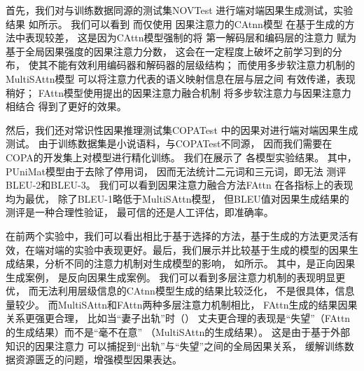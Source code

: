 
首先，我们对与训练数据同源的测试集NOVTest
进行端对端因果生成测试，实验结果
如所示。
我们可以看到
而仅使用
因果注意力的CAtnn模型
在基于生成的方法中表现较差，
这是因为CAttn模型强制的将
第一解码层和编码层的注意力
赋为基于全局因果强度的因果注意力分数，
这会在一定程度上破坏之前学习到的分布，
使其不能有效利用编码器和解码器的层级结构；
而使用多步软注意力机制的MultiSAttn模型
可以将注意力代表的语义映射信息在层与层之间
有效传递，表现稍好；
FAttn模型使用提出的因果注意力融合机制
将多步软注意力与因果注意力相结合
得到了更好的效果。


然后，我们还对常识性因果推理测试集COPATest
中的因果对进行端对端因果生成测试。
由于训练数据集是小说语料，与COPATest不同源，
因而我们需要在COPA的开发集上对模型进行精化训练。
我们在展示了
各模型实验结果。
其中，PUniMat模型由于去除了停用词，
因而无法统计二元词和三元词，即无法
测评BLEU-2和BLEU-3。
我们可以看到因果注意力融合方法FAttn
在各指标上的表现均为最优，
除了BLEU-1略低于MultiSAttn模型，
但BLEU值对因果生成结果的测评是一种合理性验证，
最可信的还是人工评估，即准确率。


在前两个实验中，我们可以看出相比于基于选择的方法，基于生成的方法更灵活有效，在端对端的实验中表现更好。最后，我们展示并比较基于生成的模型的因果生成结果，分析不同的注意力机制对生成模型的影响，
如所示。
其中，是正向因果生成案例，
是反向因果生成案例。
我们可以看到多层注意力机制的表现明显更优，
而无法利用层级信息的CAtnn模型生成的结果比较泛化，
不是很具体，信息量较少。
而MultiSAttn和FAttn两种多层注意力机制相比，
FAttn生成的结果因果关系更强更合理，
比如当“妻子出轨”时（）
丈夫更合理的表现是“失望”（FAttn的生成结果）而不是“毫不在意”
（MultiSAttn的生成结果）。
这是由于基于外部知识的因果注意力
可以捕捉到“出轨”与“失望”之间的全局因果关系，
缓解训练数据资源匮乏的问题，增强模型因果表达。
